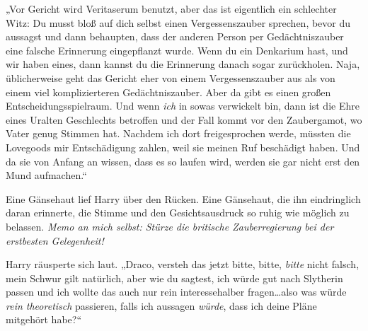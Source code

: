 „Vor Gericht wird Veritaserum benutzt, aber das ist eigentlich ein schlechter Witz: Du musst bloß auf dich selbst einen Vergessenszauber sprechen, bevor du aussagst und dann behaupten, dass der anderen Person per Gedächtniszauber eine falsche Erinnerung eingepflanzt wurde. Wenn du ein Denkarium hast, und wir haben eines, dann kannst du die Erinnerung danach sogar zurückholen. Naja, üblicherweise geht das Gericht eher von einem Vergessenszauber aus als von einem viel komplizierteren Gedächtniszauber. Aber da gibt es einen großen Entscheidungsspielraum. Und wenn \emph{ich} in sowas verwickelt bin, dann ist die Ehre eines Uralten Geschlechts betroffen und der Fall kommt vor den Zaubergamot, wo Vater genug Stimmen hat. Nachdem ich dort freigesprochen werde, müssten die Lovegoods mir Entschädigung zahlen, weil sie meinen Ruf beschädigt haben. Und da sie von Anfang an wissen, dass es so laufen wird, werden sie gar nicht erst den Mund aufmachen.“

Eine Gänsehaut lief Harry über den Rücken. Eine Gänsehaut, die ihn eindringlich daran erinnerte, die Stimme und den Gesichtsausdruck so ruhig wie möglich zu belassen. \emph{Memo an mich selbst: Stürze die britische Zauberregierung bei der erstbesten Gelegenheit!}

Harry räusperte sich laut. „Draco, versteh das jetzt bitte, bitte, \emph{bitte} nicht falsch, mein Schwur gilt natürlich, aber wie du sagtest, ich würde gut nach Slytherin passen und ich wollte das auch nur rein interessehalber fragen…also was würde \emph{rein theoretisch} passieren, falls ich aussagen \emph{würde}, dass ich deine Pläne mitgehört habe?“

